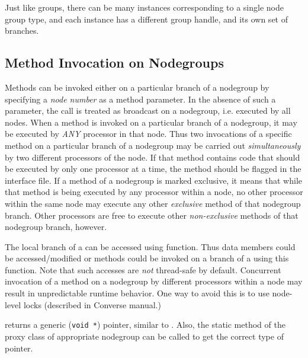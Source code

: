 Just like groups, there can be many instances corresponding to a single node
group type, and each instance has a different group handle, and its own set of
branches.


\subsection{Method Invocation on Nodegroups}

Methods can be invoked either on a particular branch of a
nodegroup by specifying a {\em node number} as a method
parameter. In the absence of such a parameter, the call is treated as broadcast
on a nodegroup, i.e. executed by all nodes. When a method is
invoked on a particular branch of a nodegroup,
it may be executed by {\em ANY} processor in that node. Thus two invocations of
a specific method on a particular branch of a
nodegroup may be carried out {\em simultaneously} by two
different processors of the node. If that method contains code that should be
executed by only one processor at a time, the method should be flagged
 in the interface file. If a method  of a
nodegroup  is marked exclusive, it means that while that method is being
executed by any processor within a node, no other processor within the same
node may execute any other {\em exclusive} method of that
nodegroup branch.  Other processors are free to
execute other {\em non-exclusive} methods of that nodegroup
branch, however.

The local branch of a  can be accessed using
 function. Thus data members could be accessed/modified
or methods could be invoked on a branch of a  using
this function. Note that such accesses are {\em not} thread-safe by default.
Concurrent invocation of a method on a nodegroup by different
processors within a node may result in unpredictable runtime behavior.  One way
to avoid this is to use node-level locks (described in Converse manual.)

 returns a generic ({\tt void *}) pointer, similar to
.  Also, the static method  of the
proxy class of appropriate nodegroup can be called to get the
correct type of pointer.
